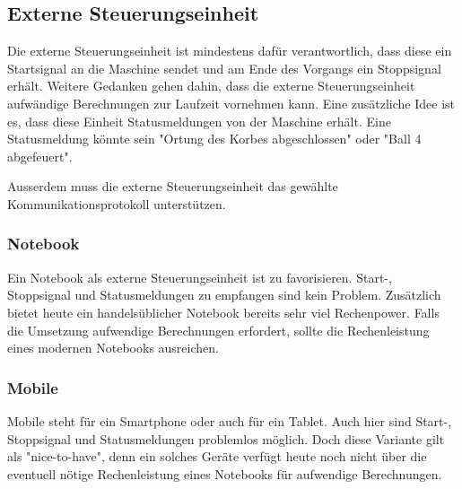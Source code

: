\subsection{Externe Steuerungseinheit}
\label{externe-steuerungseinheit}
Die externe Steuerungseinheit ist mindestens dafür verantwortlich, dass diese ein Startsignal an die Maschine sendet und am Ende des Vorgangs ein Stoppsignal erhält. Weitere Gedanken gehen dahin, dass die externe Steuerungseinheit aufwändige Berechnungen zur Laufzeit vornehmen kann. Eine zusätzliche Idee ist es, dass diese Einheit Statusmeldungen von der Maschine erhält. Eine Statusmeldung könnte sein "Ortung des Korbes abgeschlossen" oder "Ball 4 abgefeuert".

Ausserdem muss die externe Steuerungseinheit das gewählte Kommunikationsprotokoll unterstützen.

\subsubsection{Notebook}
Ein Notebook als externe Steuerungseinheit ist zu favorisieren. Start-, Stoppsignal und Statusmeldungen zu empfangen sind kein Problem. Zusätzlich bietet heute ein handelsüblicher Notebook bereits sehr viel Rechenpower. Falls die Umsetzung aufwendige Berechnungen erfordert, sollte die Rechenleistung eines modernen Notebooks ausreichen. 

\subsubsection{Mobile}
Mobile steht für ein Smartphone oder auch für ein Tablet. Auch hier sind Start-, Stoppsignal und Statusmeldungen problemlos möglich. Doch diese Variante gilt als "nice-to-have", denn ein solches Geräte verfügt heute noch nicht über die eventuell nötige Rechenleistung eines Notebooks für aufwendige Berechnungen.